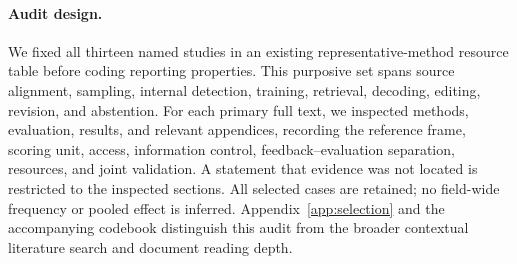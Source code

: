 \paragraph{Audit design.}
We fixed all thirteen named studies in an existing representative-method resource table before coding reporting properties. This purposive set spans source alignment, sampling, internal detection, training, retrieval, decoding, editing, revision, and abstention. For each primary full text, we inspected methods, evaluation, results, and relevant appendices, recording the reference frame, scoring unit, access, information control, feedback--evaluation separation, resources, and joint validation. A statement that evidence was not located is restricted to the inspected sections. All selected cases are retained; no field-wide frequency or pooled effect is inferred. Appendix~\ref{app:selection} and the accompanying codebook distinguish this audit from the broader contextual literature search and document reading depth.


